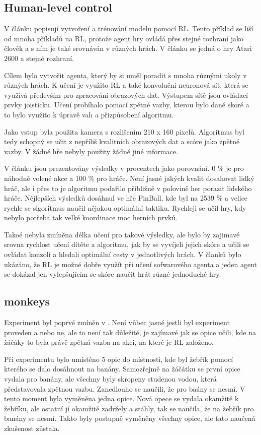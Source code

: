 \documentclass{article}
\begin{document}
\subsection{Human-level control}
V článku \cite{mnih2015human} popisují vytvoření a trénování modelu pomocí RL. Tento příklad se liší od mnoha příkladů na RL, protože agent hry ovládá přes stejné rozhraní jako člověk a s ním je také srovnáván v různých hrách. V článku se jedná o hry Atari 2600 a stejné rozhraní.

Cílem bylo vytvořit agenta, který by si uměl poradit s mnoha různými ukoly v různých hrách. K učení je využito RL a také konvoluční neuronová síť, která se využívá především pro zpracování obrazových dat. Výstupem sítě jsou ovládací prvky joisticku. Učení probíhalo pomocí zpětné vazby, kterou bylo dané skoré a to bylo využito k úpravě vah a přizpůsobení algoritmu. 

Jako vstup byla použita kamera s rozlišením 210 x 160 pixelů. Algoritmus byl tedy schopný se učit z nepříliš kvalitních obrazových dat a scóre jako zpětné vazby. V žádné hře nebyly použity žádné jiné informace. 

V článku jsou prezentovány výsledky v procentech jako porovnání. 0 \% je pro náhodně volené akce a 100 \% pro hráče. Není jasné jakých kvalit dosahovat lidký hráč, ale i přes to je algoritmu podařilo přibližně v polovině her porazit lidského hráče. Nějlepších výsledků dosáhnul ve hře PinBall, kde byl na 2539 \% a velice rychle se slgoritmus naučil nějakou optimální taktiku. Rychleji se učil hry, kdy nebylo potřeba tak velké koordinace moc herních prvků. 

Takoé nebyla zmíněna délka učení pro takové výsledky, ale bylo by zajimavé srovna rychlost učení dítěte a algoritmu, jak by se vyvíjeli jejich skóre a učili se ovládat konzoli a hledali optimální cesty v jednotlivých hrách. V članků bylo ukázáno, že RL je možné dobře využít při učení sofwarového agenta a jeden agent se dokázal jen vylepšujícím se skóre naučit hrát různé jednoduché hry. 

\subsection{monkeys}
\label{monkey}
Experiment byl poprvé zmíněn v \cite{hamel1996competing}. Není vůbec jasné jestli byl experiment proveden a nebo ne, ale to není tak důležité, je zajímavé jak se opice učili, kde na žáčáky to byla právě zpětná vazba na akci, na které je RL založeno.

Při experimentu bylo umístěno 5 opic do místnosti, kde byl žebřík pomocí kterého se dalo dosáhnout na banány. Samozřejmě na žáčátku se první opice vydala pro banány, ale všechny byly skropeny studenou vodou, která představovala zpětnou vazbu. Zanedlouho se naučili, že pro baány se nesmí. V tento moment byla vyměněna jedna opice. Nová opece se vydala okamžitě k žebříku, ale ostatní jí okamžitě zadržely a stáhly, tak se naučila, že na žebřík pro banány se nesmí. Takto byly postupně vyměněny všechny opice, ale tato naučená zkušenost zůstala. 
\end{document}

